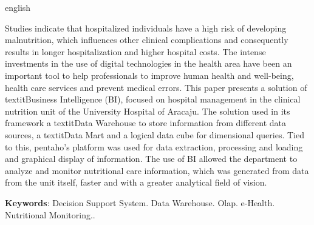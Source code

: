 \setlength{\absparsep}{18pt} %
\begin{resumo}[Abstract]
 \begin{otherlanguage*}{english}
   
Studies indicate that hospitalized individuals have a high risk of developing malnutrition, which influences other clinical complications and consequently results in longer hospitalization and higher hospital costs. The intense investments in the use of digital technologies in the health area have been an important tool to help professionals to improve human health and well-being, health care services and prevent medical errors. This paper presents a solution of textit{Business Intelligence} (BI), focused on hospital management in the clinical nutrition unit of the University Hospital of Aracaju. The solution used in its framework a textit{Data Warehouse} to store information from different data sources, a textit{Data Mart} and a logical data cube for dimensional queries. Tied to this, pentaho's platform was used for data extraction, processing and loading and graphical display of information. The use of BI allowed the department to analyze and monitor nutritional care information, which was generated from data from the unit itself, faster and with a greater analytical field of vision.

   \vspace{\onelineskip}
 
   \noindent 
   \textbf{Keywords}: Decision Support System. Data Warehouse. Olap. e-Health. Nutritional Monitoring..
 \end{otherlanguage*}
\end{resumo}